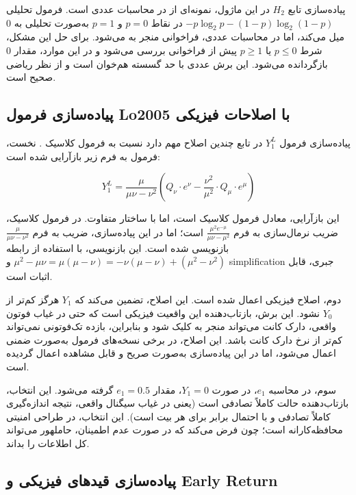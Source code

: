 پیاده‌سازی تابع $H_2$ در این ماژول، نمونه‌ای از  در محاسبات عددی است. فرمول تحلیلی $-p \log_2 p - (1-p) \log_2(1-p)$ در نقاط $p = 0$ و $p = 1$ به‌صورت تحلیلی به $0$ میل می‌کند، اما در محاسبات عددی، فراخوانی  منجر به  می‌شود. برای حل این مشکل، شرط $p \leq 0$ یا $p \geq 1$ پیش از فراخوانی  بررسی می‌شود و در این موارد، مقدار $0$ بازگردانده می‌شود. این برش عددی با حد گسسته  هم‌خوان است و از نظر ریاضی صحیح است.

\subsection{پیاده‌سازی فرمول Lo2005 با اصلاحات فیزیکی}

پیاده‌سازی فرمول $Y_1^L$ در تابع  چندین اصلاح مهم دارد نسبت به فرمول کلاسیک . نخست، فرمول به فرم زیر بازآرایی شده است:

\begin{equation}
	Y_1^{L} = \frac{\mu}{\mu \nu - \nu^2} \left( Q_\nu \cdot e^{\nu} - \frac{\nu^2}{\mu^2} \cdot Q_\mu \cdot e^{\mu} \right)
\end{equation}

این بازآرایی، معادل فرمول کلاسیک  است، اما با ساختار متفاوت. در فرمول کلاسیک، ضریب نرمال‌سازی به فرم $\frac{\mu^2 e^{-\mu}}{\mu \nu - \mu^2}$ است؛ اما در این پیاده‌سازی، ضریب به فرم $\frac{\mu}{\mu \nu - \nu^2}$ بازنویسی شده است. این بازنویسی، با استفاده از رابطه $\mu^2 - \mu \nu = \mu(\mu - \nu) = -\nu(\mu - \nu) + (\mu^2 - \nu^2)$ و simplification جبری، قابل اثبات است.

دوم، اصلاح فیزیکی  اعمال شده است. این اصلاح، تضمین می‌کند که $Y_1$ هرگز کم‌تر از $Y_0$ نشود. این برش، بازتاب‌دهنده این واقعیت فیزیکی است که حتی در غیاب فوتون واقعی، دارک کانت می‌تواند منجر به کلیک شود و بنابراین، بازده تک‌فوتونی نمی‌تواند کم‌تر از نرخ دارک کانت باشد. این اصلاح، در برخی نسخه‌های فرمول  به‌صورت ضمنی اعمال می‌شود، اما در این پیاده‌سازی به‌صورت صریح و قابل مشاهده اعمال گردیده است.

سوم، در محاسبه $e_1$، در صورت $Y_1 = 0$، مقدار $e_1 = 0.5$ گرفته می‌شود. این انتخاب، بازتاب‌دهنده حالت کاملاً تصادفی است (یعنی در غیاب سیگنال واقعی، نتیجه اندازه‌گیری کاملاً تصادفی و با احتمال برابر برای هر بیت است). این انتخاب، در طراحی امنیتی  محافظه‌کارانه است؛ چون فرض می‌کند که در صورت عدم اطمینان، حاملهور می‌تواند کل اطلاعات را بداند.

\subsection{پیاده‌سازی قیدهای فیزیکی و Early Return}

